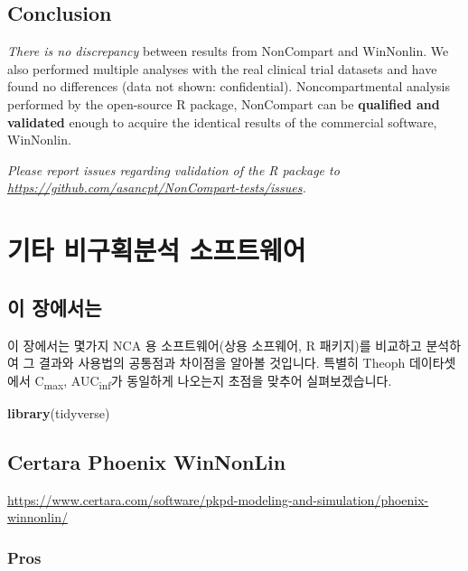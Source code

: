 \documentclass[
  12pt,
]{krantz}
\newenvironment{Shaded}{\begin{snugshade}}{\end{snugshade}}
\newcommand{\KeywordTok}[1]{\textcolor[rgb]{0.13,0.29,0.53}{\textbf{#1}}}
\newcommand{\NormalTok}[1]{#1}
\begin{document}
\hypertarget{conclusion-1}{%
\section{Conclusion}\label{conclusion-1}}

\emph{There is no discrepancy} between results from NonCompart and WinNonlin. We also performed multiple analyses with the real clinical trial datasets and have found no differences (data not shown: confidential). Noncompartmental analysis performed by the open-source R package, NonCompart can be \textbf{qualified and validated} enough to acquire the identical results of the commercial software, WinNonlin.

\emph{Please report issues regarding validation of the R package to \url{https://github.com/asancpt/NonCompart-tests/issues}.}

\hypertarget{softwares}{%
\chapter{기타 비구획분석 소프트웨어}\label{softwares}}

\hypertarget{detailschapter}{%
\section{이 장에서는}\label{detailschapter}}

이 장에서는 몇가지 NCA 용 소프트웨어(상용 소프웨어, R 패키지)를 비교하고 분석하여 그 결과와 사용법의 공통점과 차이점을 알아볼 것입니다.
특별히 Theoph 데이타셋에서 C\textsubscript{max}, AUC\textsubscript{inf}가 동일하게 나오는지 초점을 맞추어 실펴보겠습니다.

\begin{Shaded}
\begin{Highlighting}[]
\KeywordTok{library}\NormalTok{(tidyverse)}
\end{Highlighting}
\end{Shaded}

\hypertarget{certara-phoenix-winnonlin}{%
\section{Certara Phoenix WinNonLin}\label{certara-phoenix-winnonlin}}

\url{https://www.certara.com/software/pkpd-modeling-and-simulation/phoenix-winnonlin/}

\hypertarget{pros}{%
\subsection{Pros}\label{pros}}
\end{document}
